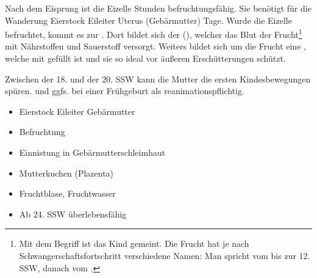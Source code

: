 

{%
Nach dem Eisprung ist die Eizelle  Stunden
befruchtungsfähig. Sie benötigt für die Wanderung Eierstock
 Eileiter  Uterus (Gebärmutter)
 Tage. Wurde die Eizelle befruchtet, kommt es
zur . Dort
bildet sich der  (), welcher 
das Blut der
Frucht\footnote{Mit dem Begriff 
ist das Kind gemeint. Die  Frucht hat je nach
Schwangerschaftsfortschritt verschiedene Namen: Man spricht
vom  bis zur 12. SSW, danach vom .} mit
Nährstoffen und Sauerstoff versorgt.
Weiters bildet sich um die Frucht eine ,
welche mit  gefüllt ist und sie so ideal vor
äußeren Erschütterungen schützt.

Zwischen der 18. und der 20. SSW kann die Mutter die ersten
Kindesbewegungen spüren.  und ggfs. bei einer
Frühgeburt als reanimationspflichtig.
}
{%
\begin{itemize}
  \item Eierstock  Eileiter  Gebärmutter
  \item Befruchtung
  \item Einnistung in Gebärmutterschleimhaut
  \item Mutterkuchen (Plazenta)
  \item Fruchtblase, Fruchtwasser
  \item Ab 24. SSW überlebensfähig
\end{itemize}

}
{}
{}
{}

